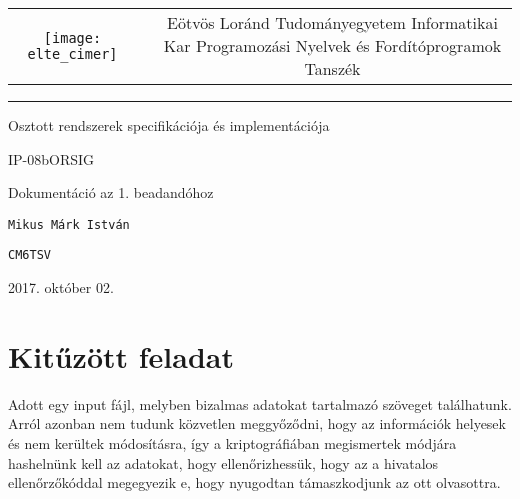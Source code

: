 \documentclass[12pt]{article}
\begin{document}
    
\begin{titlepage}
    \vspace*{0cm}
    \centering
    \begin{tabular}{cp{1cm}c}
        \begin{minipage}{4cm}
            \vspace{0pt}
            \texttt{[image: elte\_cimer]}
        \end{minipage} & &
        \begin{minipage}{7cm}
            \vspace{0pt}Eötvös Loránd Tudományegyetem \vspace{10pt} \newline
            Informatikai Kar \vspace{10pt} \newline
            Programozási Nyelvek és Fordítóprogramok Tanszék
        \end{minipage}
    \end{tabular}
    
    \vspace*{0.2cm}
    \rule{\textwidth}{1pt}
    
    \vspace*{3cm}
    {\Huge Osztott rendszerek specifikációja és implementációja }
    
    \vspace*{0.5cm}
    {\normalsize IP-08bORSIG}
    
    \vspace{2cm}
    {\huge Dokumentáció az 1. beadandóhoz}
    
    \vspace*{5cm}
    
    {\large \verb|Mikus Márk István| } %
    
    {\large \verb|CM6TSV| }  %
        
    
    \vfill
    
    \vspace*{1cm}
    2017. október 02. %
\end{titlepage}

\section{Kitűzött feladat}
Adott egy input fájl, melyben bizalmas adatokat tartalmazó szöveget találhatunk. Arról azonban nem tudunk közvetlen meggyőződni, hogy az információk helyesek és nem kerültek módosításra, így a kriptográfiában megismertek módjára hashelnünk kell az adatokat, hogy ellenőrizhessük, hogy az a hivatalos ellenőrzőkóddal megegyezik e, hogy nyugodtan támaszkodjunk az ott olvasottra.\\
\end{document}
